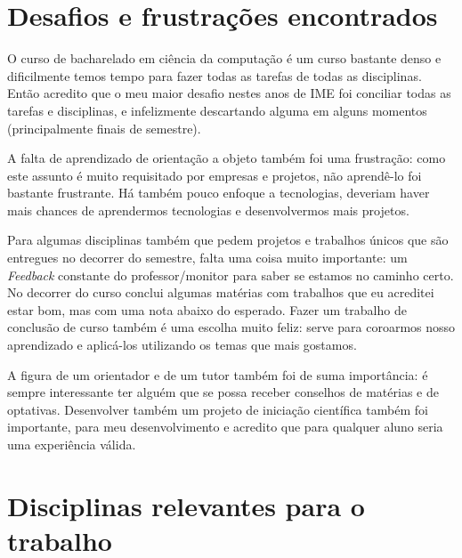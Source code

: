 
\section{Desafios e frustrações encontrados}

O curso de bacharelado em ciência da computação é um curso bastante denso e dificilmente temos tempo
para fazer todas as tarefas de todas as disciplinas. Então acredito que o meu maior desafio nestes anos de IME 
foi conciliar todas as tarefas e disciplinas, e infelizmente descartando alguma em alguns momentos 
(principalmente finais de semestre). 

A falta de aprendizado de orientação a objeto também foi uma frustração: como este assunto é muito requisitado por empresas
e projetos, não aprendê-lo foi bastante frustrante. Há também pouco enfoque a tecnologias, deveriam haver mais chances de
aprendermos tecnologias e desenvolvermos mais projetos. 

Para algumas disciplinas também que pedem projetos e trabalhos únicos que são entregues no decorrer do semestre, 
falta uma coisa muito importante: um \emph{Feedback} constante do professor/monitor para saber se estamos no caminho certo. 
No decorrer do curso conclui algumas matérias com trabalhos que eu acreditei estar bom, mas com uma nota abaixo do esperado. 
Fazer um trabalho de conclusão de curso também é uma escolha muito feliz: serve para coroarmos nosso aprendizado
e aplicá-los utilizando os temas que mais gostamos.  

A figura de um orientador e de um tutor também foi de suma importância: é sempre interessante ter alguém que se possa receber
conselhos de matérias e de optativas. Desenvolver também um projeto de iniciação científica também foi importante, para 
meu desenvolvimento e acredito que para qualquer aluno seria uma experiência válida. 

 

\section{Disciplinas relevantes para o trabalho}

